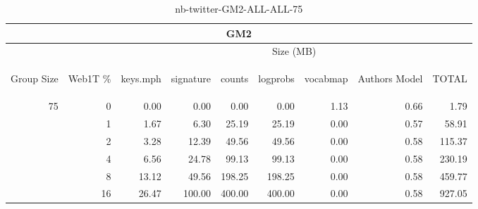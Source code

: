 \begin{center}
\begin{table}[htbp]
\begin{tabular}{ | r | r | r | r | r | r | r | r | r |}
\hline
\multicolumn{9}{|c|}{GM2}\\
\hline
 & & \multicolumn{7}{|c|}{Size (MB)}\\ \cline{3-9}
\begin{sideways}Group Size\end{sideways} & \begin{sideways}Web1T \% \end{sideways} & \begin{sideways}keys.mph\end{sideways} & \begin{sideways}signature\end{sideways} & \begin{sideways}counts\end{sideways} & \begin{sideways}logprobs\end{sideways} & \begin{sideways}vocabmap\end{sideways} & \begin{sideways}Authors Model \end{sideways} & \begin{sideways}TOTAL\end{sideways}\\
\hline
\multirow{5}{*}{75}
 & 0 & 0.00 & 0.00 & 0.00 & 0.00 & 1.13 & 0.66 & 1.79\\ \cline{2-9}
 & 1 & 1.67 & 6.30 & 25.19 & 25.19 & 0.00 & 0.57 & 58.91\\ \cline{2-9}
 & 2 & 3.28 & 12.39 & 49.56 & 49.56 & 0.00 & 0.58 & 115.37\\ \cline{2-9}
 & 4 & 6.56 & 24.78 & 99.13 & 99.13 & 0.00 & 0.58 & 230.19\\ \cline{2-9}
 & 8 & 13.12 & 49.56 & 198.25 & 198.25 & 0.00 & 0.58 & 459.77\\ \cline{2-9}
 & 16 & 26.47 & 100.00 & 400.00 & 400.00 & 0.00 & 0.58 & 927.05\\ \cline{2-9}
\hline
\end{tabular}
\caption{nb-twitter-GM2-ALL-ALL-75}
\label{table:nb-twitter-GM2-ALL-ALL-75}
\end{table}
\end{center}

